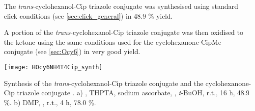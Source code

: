 The \textit{trans}-cyclohexanol-Cip triazole conjugate  was synthesised using standard click conditions (see \ref{sec:click_general}) in 48.9 \% yield.

A portion of the \textit{trans}-cyclohexanol-Cip triazole conjugate  was then oxidised to the ketone using the same conditions used for the cyclohexanone-CipMe conjugate (see \ref{sec:Ocy6}) in very good yield.

\begin{scheme}[H]
	\begin{center}
		\texttt{[image: HOcy6NH4T4Cip\_synth]}
		\caption{Synthesis of the \textit{trans}-cyclohexanol-Cip triazole conjugate  and the cyclohexanone-Cip triazole conjugate . 
		a) , THPTA, sodium ascorbate, , \textit{t}-BuOH, r.t., 16 h, 48.9 \%. 
		b) DMP, , r.t., 4 h, 78.0 \%.
		\label{sch:HOcy6NH4T4Cip_synth}}
	\end{center}
\end{scheme}
